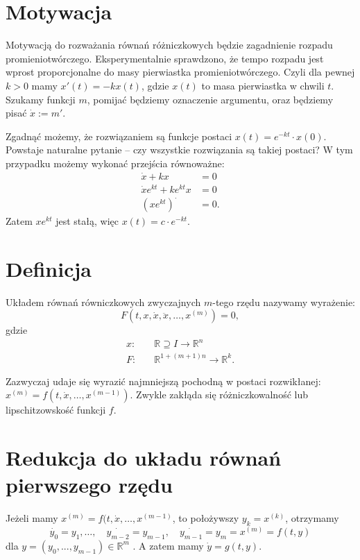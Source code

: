 \section{Motywacja}


Motywacją do rozważania równań różniczkowych będzie zagadnienie rozpadu promieniotwórczego.
Eksperymentalnie sprawdzono, że tempo rozpadu jest wprost proporcjonalne do masy pierwiastka promieniotwórczego.
Czyli dla pewnej $k>0$ mamy $x'(t)=-kx(t)$, gdzie $x\left(t \right) $ to masa pierwiastka w chwili $t$.
Szukamy funkcji $m$, pomijać będziemy oznaczenie argumentu, oraz będziemy pisać $\dot{x}:=m'$. 

Zgadnąć możemy, że rozwiązaniem są funkcje postaci $x\left( t \right) = e^{-kt}\cdot x\left( 0 \right) $. Powstaje naturalne pytanie -- czy wszystkie rozwiązania są takiej postaci? W tym przypadku możemy wykonać przejścia równoważne:
\begin{align*}
	\dot{x}+kx&=0\\
	\dot{x}e^{kt}+ke^{kt}x&=0\\
	\left( xe^{kt} \right) ^{\cdot }&=0 
.\end{align*} Zatem $xe^{kt}$ jest stałą, więc $x\left( t \right) =c\cdot e^{-kt}$. 

\section{Definicja}
Układem równań równiczkowych zwyczajnych $m$-tego rzędu nazywamy wyrażenie: \[
	F\left(t,x,\dot{x},\ddot{x},\ldots,x^{(m)}\right)=0 
,\] gdzie 
\begin{align*}
	x: & \quad\mathbb{R}\supseteq I \to \mathbb{R}^{n}\\
	F:&  \quad\mathbb{R}^{1+\left( m+1 \right) n} \to \mathbb{R}^{k}
.\end{align*}

Zazwyczaj udaje się wyrazić najmniejszą pochodną w postaci rozwikłanej: $x^{\left( m \right) }=f\left( t, \dot{x}, \ldots, x^{\left( m-1 \right) } \right) $. Zwykle zakłąda się różniczkowalność lub lipschitzowskość funkcji $f$. 

\section{Redukcja do układu równań pierwszego rzędu}

Jeżeli mamy $x^{\left( m \right) }=f(t,\dot{x},\ldots,x^{\left( m-1 \right) }$, to położywszy $y_{k}=x^{(k)}$, otrzymamy $$\dot{y_{0}} = y_1, \ldots, \quad \dot{y_{m-2}}=y_{m-1}, \quad \dot{y_{m-1}}=y_m=x^{\left( m \right) }=f\left( t,y \right) $$ dla $y=\left( y_0,...,y_{m-1} \right) \in \mathbb{R}^{m}$ . 
A zatem mamy $\dot{y} = g\left( t,y \right) $.
